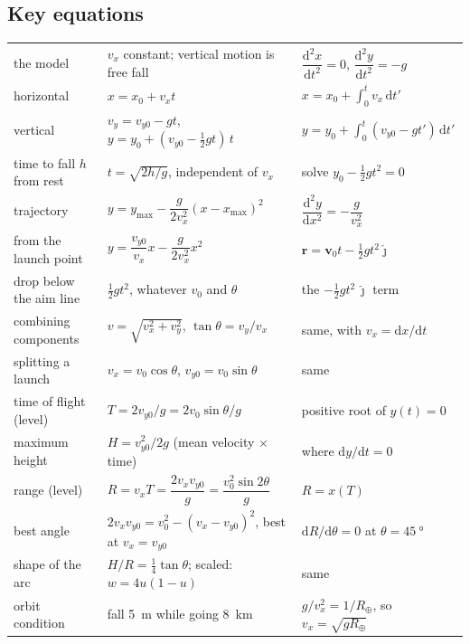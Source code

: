 \documentclass[11pt,twoside,openany]{book}
\newcommand{\dd}{\mathrm{d}}
\newcommand{\viewtag}[3]{\fcolorbox{#2}{#3}{\footnotesize\textbf{\textcolor{#2}{#1}}}}
\newcommand{\elemtag}{\viewtag{Elementary}{elemcol}{elempale}}
\newcommand{\calctag}{\viewtag{Calculus}{calccol}{calcpale}}
\begin{document}
\subsection*{Key equations}
\begin{center}
\renewcommand{\arraystretch}{2.4}
\setlength{\tabcolsep}{4pt}
\small
\begin{tabular}{lll}
\toprule
 & \elemtag & \calctag \\
\midrule
the model & $v_x$ constant; vertical motion is free fall & $\dfrac{\dd^2 x}{\dd t^2} = 0$, \; $\dfrac{\dd^2 y}{\dd t^2} = -g$ \\
horizontal & $x = x_0 + v_x t$ & $x = x_0 + \displaystyle\int_0^t v_x\,\dd t'$ \\
vertical & $v_y = v_{y0} - gt$, \; $y = y_0 + (v_{y0} - \tfrac12 gt)\,t$ & $y = y_0 + \displaystyle\int_0^t (v_{y0}-gt')\,\dd t'$ \\
time to fall $h$ from rest & $t = \sqrt{2h/g}$, independent of $v_x$ & solve $y_0 - \tfrac12 gt^2 = 0$ \\
trajectory & $y = y_{\max} - \dfrac{g}{2v_x^{2}}(x-x_{\max})^{2}$ & $\dfrac{\dd^2 y}{\dd x^2} = -\dfrac{g}{v_x^{2}}$ \\
from the launch point & $y = \dfrac{v_{y0}}{v_x}x - \dfrac{g}{2v_x^{2}}x^{2}$ & $\mathbf{r} = \mathbf{v}_0 t - \tfrac12 gt^{2}\hat{\mathbf{\jmath}}$ \\
drop below the aim line & $\tfrac12 g t^{2}$, whatever $v_0$ and $\theta$ & the $-\tfrac12 gt^2\,\hat{\mathbf{\jmath}}$ term \\
combining components & $v = \sqrt{v_x^{2}+v_y^{2}}$, \; $\tan\theta = v_y/v_x$ & same, with $v_x = \dd x/\dd t$ \\
splitting a launch & $v_x = v_0\cos\theta$, \quad $v_{y0} = v_0\sin\theta$ & same \\
time of flight (level) & $T = 2v_{y0}/g = 2v_0\sin\theta/g$ & positive root of $y(t) = 0$ \\
maximum height & $H = v_{y0}^{2}/2g$ (mean velocity $\times$ time) & where $\dd y/\dd t = 0$ \\
range (level) & $R = v_xT = \dfrac{2v_xv_{y0}}{g} = \dfrac{v_0^{2}\sin2\theta}{g}$ & $R = x(T)$ \\
best angle & $2v_xv_{y0} = v_0^2 - (v_x-v_{y0})^2$, best at $v_x = v_{y0}$ & $\dd R/\dd\theta = 0$ at $\theta = \SI{45}{\degree}$ \\
shape of the arc & $H/R = \tfrac14\tan\theta$; \; scaled: $w = 4u(1-u)$ & same \\
orbit condition & fall \SI{5}{\metre} while going \SI{8}{\kilo\metre} & $g/v_x^{2} = 1/R_\oplus$, so $v_x = \sqrt{gR_\oplus}$ \\
\bottomrule
\end{tabular}
\end{center}
\end{document}
